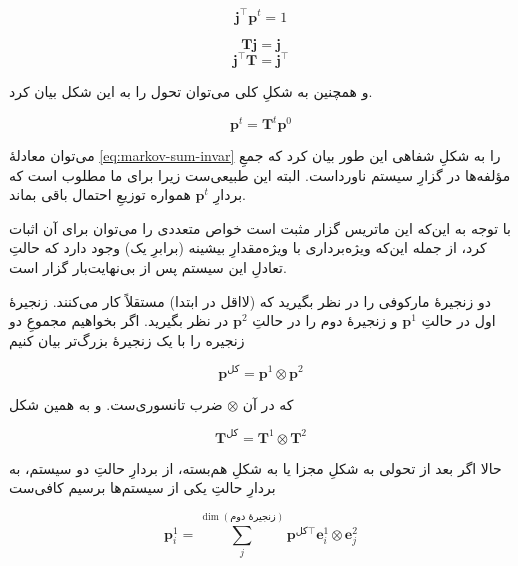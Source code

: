\documentclass[a4paper,12pt]{article}
\begin{document}
\begin{equation} \mathbf{j}^\intercal \mathbf{p}^t = 1 \end{equation}

\begin{equation} \mathbf{T} \mathbf{j} = \mathbf{j} \end{equation}
\begin{equation} \mathbf{j}^\intercal \mathbf{T} = \mathbf{j}^\intercal \label{eq:markov-sum-invar} \end{equation}

و همچنین به شکلِ کلی می‌توان تحول را به این شکل بیان کرد.

\begin{equation} \mathbf{p}^t = \mathbf{T}^t \mathbf{p}^0 \end{equation}

می‌توان معادلهٔ 
\ref{eq:markov-sum-invar}
 را به شکلِ شفاهی این طور بیان کرد که جمعِ مؤلفه‌ها در گزارِ سیستم ناورداست. البته این طبیعی‌ست زیرا برای ما مطلوب است که بردارِ 
 \( \mathbf{p}^t \)
 همواره توزیعِ احتمال باقی بماند.

با توجه به این‌که این ماتریس گزار مثبت است خواص متعددی را می‌توان برای آن اثبات کرد، از جمله این‌که ویژه‌برداری با ویژه‌مقدارِ بیشینه (برابرِ یک) وجود دارد که حالتِ تعادلِ این سیستم پس از بی‌نهایت‌بار گزار است.


دو زنجیرهٔ مارکوفی را در نظر بگیرید که (لااقل در ابتدا) مستقلاً کار می‌کنند. زنجیرهٔ اول در حالتِ 
\( \mathbf{p}^1 \)
و زنجیرهٔ دوم را در حالتِ 
\( \mathbf{p}^2 \) 
در نظر بگیرید. اگر بخواهیم مجموعِ دو زنجیره را با یک زنجیرهٔ بزرگ‌تر بیان کنیم

\begin{equation} \mathbf{p}^{\text{کل}} = \mathbf{p}^1 \otimes \mathbf{p}^2 \end{equation}

که در آن \(\otimes\) ضرب تانسوری‌ست.
و به همین شکل

\begin{equation} \mathbf{T}^{\text{کل}} = \mathbf{T}^1 \otimes \mathbf{T}^2 \end{equation}

حالا اگر بعد از تحولی به شکلِ مجزا یا به شکلِ هم‌بسته، از بردارِ حالتِ دو سیستم، به بردارِ حالتِ یکی از سیستم‌ها برسیم کافی‌ست

\begin{equation} \mathbf{p}^1_i = \sum_{j}^{\dim(\text{زنجیرهٔ دوم})} \mathbf{p}^{\text{کل}\intercal} \mathbf{e}^1_i \otimes \mathbf{e}^2_j \end{equation}
\end{document}
